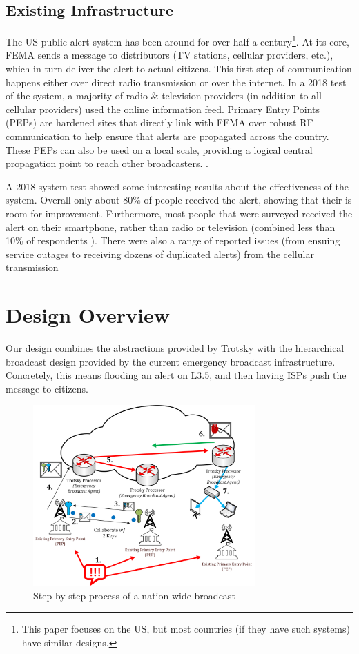 \subsection{Existing Infrastructure}\label{infrabckgrnd}
The US public alert system has been around for over half a century\footnote{This paper focuses on the US, but most countries (if they have such systems) have similar designs.}. At its core, FEMA sends a message to distributors (TV stations, cellular providers, etc.), which in turn deliver the alert to actual citizens. This first step of communication happens either over direct radio transmission or over the internet. In a 2018 test of the system, a majority of radio \& television providers (in addition to all cellular providers) used the online information feed. Primary Entry Points (PEPs) are hardened sites that directly link with FEMA over robust RF communication to help ensure that alerts are propagated across the country. These PEPs can also be used on a local scale, providing a logical central propagation point to reach other broadcasters. \cite{ipaws101}. 

A 2018 system test showed some interesting results about the effectiveness of the system. Overall only about 80\% of people received the alert, showing that their is room for improvement. Furthermore, most people that were surveyed received the alert on their smartphone, rather than radio or television (combined less than 10\% of respondents ). There were also a range of reported issues (from ensuing service outages to receiving dozens of duplicated alerts) from the cellular transmission\cite{weatest,everbridge}
\section{Design Overview}
Our design combines the abstractions provided by Trotsky with the hierarchical broadcast design provided by the current emergency broadcast infrastructure. Concretely, this means flooding an alert on L3.5, and then having ISPs push the message to citizens. 

\begin{figure}[tp]
\centering
\includegraphics[width=8.5cm]{figures/full_diagram_v2.png}
\caption{Step-by-step process of a nation-wide broadcast}
\label{fig:brdcast}
\end{figure}


